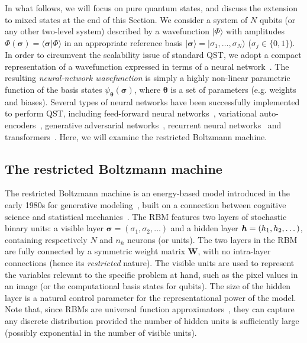\documentclass[twocolumn,english,reprint,superscriptaddress,longbibliography,pra]{revtex4-1}
\begin{document}
In what follows, we will focus on pure quantum states, and discuss the extension to mixed states at the end of this Section. We consider a system of $N$ qubits (or any other two-level system) described by a wavefunction $|\Phi\rangle$ with amplitudes $\Phi(\bm{\sigma}) = \langle\bm{\sigma}|\Phi\rangle$ in an appropriate reference basis $|\bm{\sigma}\rangle=|\sigma_1,\dots,\sigma_N\rangle$ ($\sigma_j\in\{0,1\}$). In order to circumvent the scalability issue of standard QST, we adopt a compact representation of a wavefunction expressed in terms of a neural network~\cite{Carleo_2017}. The resulting {\it neural-network wavefunction} is simply a highly non-linear parametric function of the basis states $\psi_{\bm{\theta}}(\bm{\sigma})$, where $\bm\theta$ is a set of parameters (e.g. weights and biases). Several types of neural networks have been successfully implemented to perform QST, including feed-forward neural networks~\cite{biamonte_qst,xin_local-measurement-based_2019}, variational auto-encoders~\cite{rocchetto}, generative adversarial networks~\cite{NoriGAN}, recurrent neural networks~\cite{carrasquilla_povm,morawetz2020} and transformers~\cite{Cha2020}. Here, we will examine the restricted Boltzmann machine.


\subsection{The restricted Boltzmann machine}
The restricted Boltzmann machine is an energy-based model introduced in the early 1980s for generative modeling~\cite{Ackley85,Smolensky1986}, built on a connection between cognitive science and statistical mechanics~\cite{Little74,Little78,Hopfield82}. The RBM features two layers of stochastic binary units: a visible layer $\bm{\sigma}=(\sigma_1,\sigma_2,\dots)$ and a hidden layer $\linebreak\bm{h}=(h_1,h_2,\dots)$, containing respectively $N$ and $n_h$ neurons (or units). The two layers in the RBM are fully connected by a symmetric weight matrix $\bm{W}$, with no intra-layer connections (hence its {\it restricted} nature). The visible units are used to represent the variables relevant to the specific problem at hand, such as the pixel values in an image (or the computational basis states for qubits). The size of the hidden layer is a natural control parameter for the representational power of the model. Note that, since RBMs are universal function approximators~\cite{LeRoux2008}, they can capture any discrete distribution provided the number of hidden units is sufficiently large (possibly exponential in the number of visible units).
\end{document}
